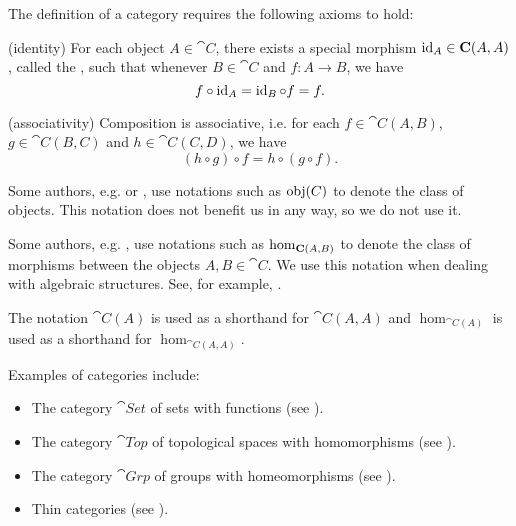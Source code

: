\begin{definition}
  The definition of a category requires the following axioms to hold:
  \begin{thmenum}[resume=def:category]
    (identity) For each object \( A \in \cat{C} \), there exists a special morphism \( \operatorname{id}_A \in \operatorname{\mathbf{C}}(A, A) \), called the , such that whenever \( B \in \cat{C} \) and \( f: A \to B \), we have
    \begin{equation*}
      f \circ \operatorname{id}_A = \operatorname{id}_B \circ f = f.
    \end{equation*}

    (associativity) Composition is associative, i.e. for each \( f \in \cat{C}(A, B) \), \( g \in \cat{C}(B, C) \) and \( h \in \cat{C}(C, D) \), we have
    \begin{equation*}
      (h \circ g) \circ f = h \circ (g \circ f).
    \end{equation*}
  \end{thmenum}
\end{definition}

\begin{remark}\label{rem:category_obj_hom}
  Some authors, e.g. \cite{Leinster2016Basic} or \cite{Aluffi2009}, use notations such as \( \operatorname{obj}(C) \) to denote the class of objects. This notation does not benefit us in any way, so we do not use it.

  Some authors, e.g. \cite{MacLane1994}, use notations such as \( \operatorname{hom}_{\operatorname{\mathbf{C}}(A, B)} \) to denote the class of morphisms between the objects \( A, B \in \cat{C} \). We use this notation when dealing with algebraic structures. See, for example, .

  The notation \( \cat{C}(A) \) is used as a shorthand for \( \cat{C}(A, A) \) and \( \hom_{\cat{C}(A)} \) is used as a shorthand for \( \hom_{\cat{C}(A, A)} \).
\end{remark}

\begin{example}\label{ex:categories}
  Examples of categories include:

  \begin{itemize}
    \item The category \( \cat{Set} \) of sets with functions (see ).
    \item The category \( \cat{Top} \) of topological spaces with homomorphisms (see ).
    \item The category \( \cat{Grp} \) of groups with homeomorphisms (see ).
    \item Thin categories (see ).
  \end{itemize}
\end{example}

